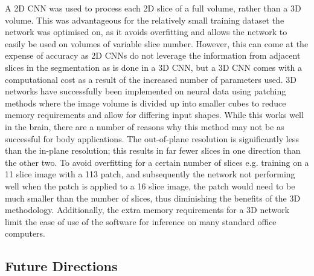 A 2D \ac{CNN} was used to process each 2D slice of a full volume, rather than a 3D volume. This was advantageous for the relatively small training dataset the network was optimised on, as it avoids overfitting and allows the network to easily be used on volumes of variable slice number. However, this can come at the expense of accuracy as 2D \ac{CNN}s do not leverage the information from adjacent slices in the segmentation as is done in a 3D \ac{CNN}, but a 3D \ac{CNN} comes with a computational cost as a result of the increased number of parameters used. 3D networks have successfully been implemented on neural data using patching methods where the image volume is divided up into smaller cubes \cite{wachinger_deepnat_2018} to reduce memory requirements and allow for differing input shapes. While this works well in the brain, there are a number of reasons why this method may not be as successful for body applications. The out-of-plane resolution is significantly less than the in-plane resolution; this results in far fewer slices in one direction than the other two. To avoid overfitting for a certain number of slices e.g. training on a 11 slice image with a 113 patch, and subsequently the network not performing well when the patch is applied to a 16 slice image, the patch would need to be much smaller than the number of slices, thus diminishing the benefits of the 3D methodology. Additionally, the extra memory requirements for a 3D network limit the ease of use of the software for inference on many standard office computers.

\subsection{Future Directions}

